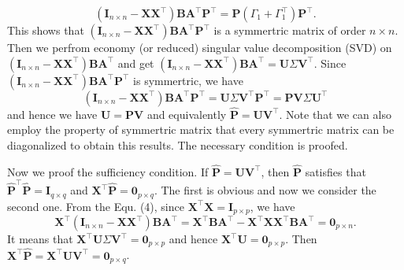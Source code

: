 \documentclass[titlepage,11pt,twoside]{article}
\begin{document}
\begin{equation}
(\mathbf{I}_{n\times n}-\mathbf{X}\mathbf{X}^{\top})\mathbf{B}\mathbf{A}^{\top}\mathbf{P}^{\top}
=
\mathbf{P}(\Gamma_{1}+\Gamma_{1}^{\top})\mathbf{P}^{\top}
.
\end{equation}
This shows that $(\mathbf{I}_{n\times n}-\mathbf{X}\mathbf{X}^{\top})\mathbf{B}\mathbf{A}^{\top}\mathbf{P}^{\top}$ is a symmertric matrix of order $n\times n$. Then we perfrom economy (or reduced) singular value decomposition (SVD) on $(\mathbf{I}_{n\times n}-\mathbf{X}\mathbf{X}^{\top})\mathbf{B}\mathbf{A}^{\top}$ and get 
$(\mathbf{I}_{n\times n}-\mathbf{X}\mathbf{X}^{\top})\mathbf{B}\mathbf{A}^{\top}=\mathbf{U}\Sigma\mathbf{V}^{\top}$.
Since $(\mathbf{I}_{n\times n}-\mathbf{X}\mathbf{X}^{\top})\mathbf{B}\mathbf{A}^{\top}\mathbf{P}^{\top}$ is symmertric, we have
\begin{equation}
(\mathbf{I}_{n\times n}-\mathbf{X}\mathbf{X}^{\top})\mathbf{B}\mathbf{A}^{\top}\mathbf{P}^{\top}
=
\mathbf{U}\Sigma\mathbf{V}^{\top}\mathbf{P}^{\top}
=
\mathbf{P}\mathbf{V}\Sigma\mathbf{U}^{\top}
\end{equation}
and hence we have $\mathbf{U}=\mathbf{P}\mathbf{V}$ and equivalently $\mathbf{\hat{P}}=\mathbf{U}\mathbf{V}^{\top}$. Note that we can also employ the property of symmertric matrix that every symmertric matrix can be diagonalized to obtain this results. The necessary condition is proofed. 

Now we proof the sufficiency condition. If $\mathbf{\hat{P}}=\mathbf{U}\mathbf{V}^{\top}$, then $\mathbf{\hat{P}}$ satisfies that $\mathbf{\hat{P}}^{\top}\mathbf{\hat{P}}=\mathbf{I}_{q\times q}$ and $\mathbf{X}^{\top}\mathbf{\hat{P}}=\mathbf{0}_{p\times q}$. The first is obvious and now we consider the second one. From the Equ. (4), since $\mathbf{X}^{\top}\mathbf{X}=\mathbf{I}_{p\times p}$, we have  
\begin{equation}
\mathbf{X}^{\top}(\mathbf{I}_{n\times n}-\mathbf{X}\mathbf{X}^{\top})\mathbf{B}\mathbf{A}^{\top}=\mathbf{X}^{\top}\mathbf{B}\mathbf{A}^{\top}-\mathbf{X}^{\top}\mathbf{X}\mathbf{X}^{\top}\mathbf{B}\mathbf{A}^{\top}
=
\mathbf{0}_{p\times n}
.
\end{equation}
It means that $\mathbf{X}^{\top}\mathbf{U}\Sigma\mathbf{V}^{\top}=\mathbf{0}_{p\times p}$ and hence $\mathbf{X}^{\top}\mathbf{U}=\mathbf{0}_{p\times p}$. Then $\mathbf{X}^{\top}\mathbf{\hat{P}}=\mathbf{X}^{\top}\mathbf{U}\mathbf{V}^{\top}=\mathbf{0}_{p\times q}$.
\end{document}
